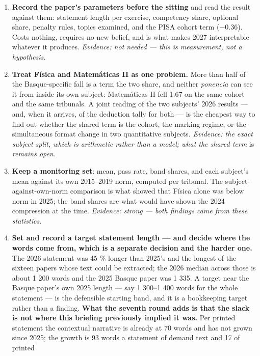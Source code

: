 \documentclass[
  10.5pt,
  a4paper,
  DIV=11,
  numbers=noendperiod]{scrartcl}
\providecommand{\tightlist}{%
  \setlength{\itemsep}{0pt}\setlength{\parskip}{0pt}}
\begin{document}
\begin{enumerate}
\def\labelenumi{\arabic{enumi}.}
\tightlist
\item
  \textbf{Record the paper's parameters before the sitting} and read the
  result against them: statement length per exercise, competency share,
  optional share, penalty rules, topics examined, and the PISA cohort
  term (\(-0.36\)). Costs nothing, requires no new belief, and is what
  makes 2027 interpretable whatever it produces. \emph{Evidence: not
  needed --- this is measurement, not a hypothesis.}
\item
  \textbf{Treat Física and Matemáticas II as one problem.} More than
  half of the Basque-specific fall is a term the two share, and neither
  \emph{ponencia} can see it from inside its own subject: Matemáticas II
  fell 1.67 on the same cohort and the same tribunals. A joint reading
  of the two subjects' 2026 results --- and, when it arrives, of the
  deduction tally for both --- is the cheapest way to find out whether
  the shared term is the cohort, the marking regime, or the simultaneous
  format change in two quantitative subjects. \emph{Evidence: the exact
  subject split, which is arithmetic rather than a model; what the
  shared term} is \emph{remains open.}
\item
  \textbf{Keep a monitoring set}: mean, pass rate, band shares, and each
  subject's mean against its own 2015--2019 norm, computed per tribunal.
  The subject-against-own-norm comparison is what showed that Física
  alone was below norm in 2025; the band shares are what would have
  shown the 2024 compression at the time. \emph{Evidence: strong ---
  both findings came from these statistics.}
\item
  \textbf{Set and record a target statement length --- and decide where
  the words come from, which is a separate decision and the harder one.}
  The 2026 statement was 45 \% longer than 2025's and the longest of the
  sixteen papers whose text could be extracted; the 2026 median across
  those is about 1 200 words and the 2025 Basque paper was 1 335. A
  target near the Basque paper's own 2025 length --- say 1 300--1 400
  words for the whole statement --- is the defensible starting band, and
  it is a bookkeeping target rather than a finding. \textbf{What the
  seventh round adds is that the slack is not where this briefing
  previously implied it was.} Per printed statement the contextual
  narrative is already at 70 words and has not grown since 2025; the
  growth is 93 words a statement of demand text and 17 of printed

\end{enumerate}
\end{document}
